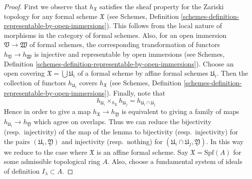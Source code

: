 \begin{proof}
First we observe that $h_\mathfrak X$ satisfies the sheaf property for
the Zariski topology for any formal scheme $\mathfrak X$ (see
Schemes, Definition \ref{schemes-definition-representable-by-open-immersions}).
This follows from the local nature of morphisms in the category
of formal schemes. Also, for an open immersion
$\mathfrak V \to \mathfrak W$ of formal schemes,
the corresponding transformation of functors $h_\mathfrak V \to h_\mathfrak W$
is injective and representable by open immersions (see
Schemes, Definition \ref{schemes-definition-representable-by-open-immersions}).
Choose an open covering $\mathfrak X = \bigcup \mathfrak U_i$
of a formal scheme by affine formal schemes $\mathfrak U_i$.
Then the collection of functors
$h_{\mathfrak U_i}$ covers $h_\mathfrak X$ (see
Schemes, Definition \ref{schemes-definition-representable-by-open-immersions}).
Finally, note that
$$
h_{\mathfrak U_i} \times_{h_\mathfrak X} h_{\mathfrak U_j} =
h_{\mathfrak U_i \cap \mathfrak U_j}
$$
Hence in order to give a map $h_\mathfrak X \to h_\mathfrak Y$
is equivalent to giving a family of maps
$h_{\mathfrak U_i} \to h_\mathfrak Y$ which agree on overlaps.
Thus we can reduce the bijectivity (resp.\ injectivity) of the map
of the lemma to bijectivity (resp.\ injectivity) for the pairs
$(\mathfrak U_i, \mathfrak Y)$
and injectivity (resp.\ nothing)
for $(\mathfrak U_i \cap \mathfrak U_j, \mathfrak Y)$.
In this way we reduce to the case where $\mathfrak X$ is an
affine formal scheme. Say $\mathfrak X = \text{Spf}(A)$
for some admissible topological ring $A$. Also, choose a
fundamental system of ideals of definition $I_\lambda \subset A$.


\end{proof}
